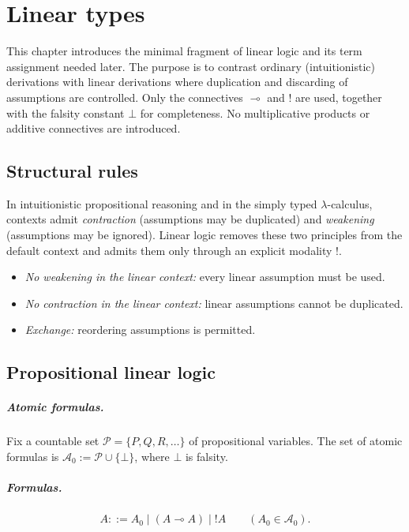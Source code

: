 \chapter{Linear types}
\label{chap:linear-types}

This chapter introduces the minimal fragment of linear logic and its term assignment needed later. The purpose is to contrast ordinary (intuitionistic) derivations with linear derivations where duplication and discarding of assumptions are controlled. Only the connectives $\multimap$ and ${!}$ are used, together with the falsity constant $\bot$ for completeness. No multiplicative products or additive connectives are introduced.

\section{Structural rules}
\label{sec:linear-structural}

In intuitionistic propositional reasoning and in the simply typed $\lambda$-calculus, contexts admit \emph{contraction} (assumptions may be duplicated) and \emph{weakening} (assumptions may be ignored). Linear logic removes these two principles from the default context and admits them only through an explicit modality ${!}$.

\begin{itemize}
  \item \textit{No weakening in the linear context:} every linear assumption must be used.
  \item \textit{No contraction in the linear context:} linear assumptions cannot be duplicated.
  \item \textit{Exchange:} reordering assumptions is permitted.
\end{itemize}

\section{Propositional linear logic}
\label{sec:lin-logic}

\paragraph{Atomic formulas.}
Fix a countable set $\mathcal{P}=\{P,Q,R,\dots\}$ of propositional variables. The set of atomic formulas is $\mathcal{A}_0 := \mathcal{P} \cup \{\bot\}$, where $\bot$ is falsity.

\paragraph{Formulas.}
\[
A ::= A_0 \mid (A \multimap A) \mid {!}A \qquad (A_0 \in \mathcal{A}_0).
\]

